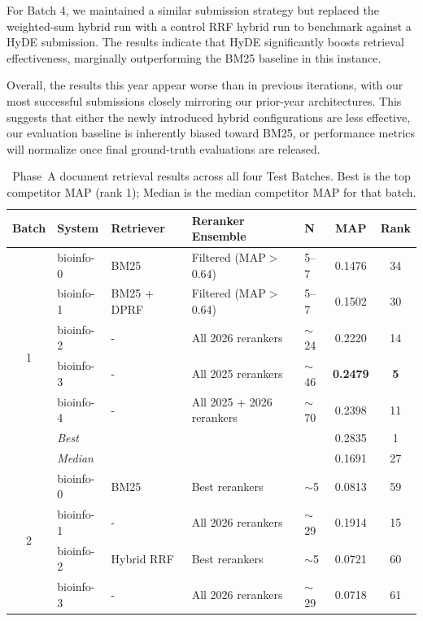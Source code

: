 For Batch 4, we maintained a similar submission strategy but replaced the weighted-sum hybrid run with a control RRF hybrid run to benchmark against a HyDE submission. The results indicate that HyDE significantly boosts retrieval effectiveness, marginally outperforming the BM25 baseline in this instance.

Overall, the results this year appear worse than in previous iterations, with our most successful submissions closely mirroring our prior-year architectures. This suggests that either the newly introduced hybrid configurations are less effective, our evaluation baseline is inherently biased toward BM25, or performance metrics will normalize once final ground-truth evaluations are released.

\begin{table}[ht]
  \centering
  \caption{Phase~A document retrieval results across all four Test Batches. Best is the top competitor MAP (rank 1); Median is the median competitor MAP for that batch.}
  \label{tab:phasea-all}
  \footnotesize
  \begin{tabular}{cl|lll|cc}
    \toprule
    \textbf{Batch} & \textbf{System} & \textbf{Retriever} & \textbf{Reranker Ensemble} & \textbf{N} & \textbf{MAP} & \textbf{Rank} \\
    \midrule
    \multirow{7}{*}{1}
    & bioinfo-0 & BM25 & Filtered (MAP$>$0.64) & 5--7 & 0.1476 & 34 \\
    & bioinfo-1 & BM25 + DPRF & Filtered (MAP$>$0.64) & 5--7 & 0.1502 & 30 \\
    & bioinfo-2 & - & All 2026 rerankers & $\sim$24 & 0.2220 & 14 \\
    & bioinfo-3 & - & All 2025 rerankers & $\sim$46 & \textbf{0.2479} & \textbf{5} \\
    & bioinfo-4 & - & All 2025 + 2026 rerankers & $\sim$70 & 0.2398 & 11 \\
    \cmidrule(l){2-7}
    & \textit{Best} & \multicolumn{3}{l|}{} & 0.2835 & 1 \\
    & \textit{Median} & \multicolumn{3}{l|}{} & 0.1691 & 27 \\
    \midrule
    \multirow{7}{*}{2}
    & bioinfo-0 & BM25 & Best rerankers & $\sim$5 & 0.0813 & 59 \\
    & bioinfo-1 & - & All 2026 rerankers & $\sim$29 & 0.1914 & 15 \\
    & bioinfo-2 & Hybrid RRF & Best rerankers & $\sim$5 & 0.0721 & 60 \\
    & bioinfo-3 &- & All 2026 rerankers & $\sim$29 & 0.0718 & 61 \\

\end{tabular}
\end{table}
